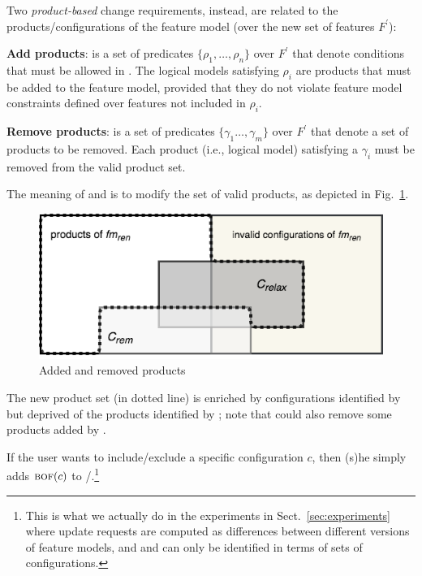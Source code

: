 \begin{tikzborder}{\cite{Gargantini16:validation}}
\begin{tikzborder}{\cite{gargantini_combinatorial_2017}}
\begin{tikzborder}{\cite{gargantini_combinatorial_2017}}
\begin{tikzborder}{\cite{garn2019}}
\begin{tikzborder}{\cite{arcaini2019achieving}}
\begin{mydef}
		Two \emph{product-based} change requirements, instead, are related to the products/configurations of the feature model (over the new set of features $F^\prime$):
		\begin{compactitem}
			\item {\bf Add products}: \CFrelax is a set of predicates $\{ \rho_1, \ldots, \rho_n\}$ over $F^\prime$ that denote conditions that must be allowed in \fmp. The logical models satisfying $\rho_i$ are products that must be added to the feature model, provided that they do not violate feature model constraints defined over features not included in $\rho_i$.
			\item {\bf Remove products}: \CFrem is a set of predicates $\{ \gamma_1 \ldots, \gamma_m\}$ over $F^\prime$ that denote a set of products to be removed. Each product (i.e., logical model) satisfying a $\gamma_i$ must be removed from the valid product set.
		\end{compactitem}
	\end{mydef}
	
	The meaning of \CFrelax and \CFrem is to modify the set of valid products, as depicted in Fig.~\ref{fig:cremcrelax}.
	\be
	\begin{figure}[!htb]
		\begin{center}
			\includegraphics[width=.8\textwidth]{images/CremCrelax}
		\end{center}
		\caption{Added and removed products}
		\label{fig:cremcrelax}
	\end{figure}
	\bb The new product set (in dotted line) is enriched by configurations identified by \CFrelax but deprived of the products identified by \CFrem; note that \CFrem could also remove some products added by \CFrelax.
	
	If the user wants to include/exclude a specific configuration $c$, then (s)he simply adds $\textsc{bof}(c)$ to \CFrelax/\CFrem.\footnote{This is what we actually do in the experiments in Sect.~\ref{sec:experiments} where update requests are computed as differences between different versions of feature models, and \CFrelax and \CFrem can only be identified in terms of sets of configurations.}\be
	

\end{tikzborder}
\end{tikzborder}
\end{tikzborder}
\end{tikzborder}
\end{tikzborder}
